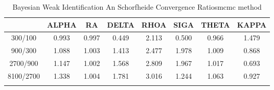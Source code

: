 \documentclass[a4paper,10pt]{article}
\begin{document}
\centering
\begin{longtable}{cccccccc}
\toprule
 & ALPHA & RA & DELTA & RHOA & SIGA & THETA & KAPPA \\
\midrule
300/100 & 0.993 & 0.997 & 0.449 & 2.113 & 0.500 & 0.966 & 1.479 \\
900/300 & 1.088 & 1.003 & 1.413 & 2.477 & 1.978 & 1.009 & 0.868 \\
2700/900 & 1.147 & 1.002 & 1.568 & 2.809 & 1.967 & 1.017 & 0.693 \\
8100/2700 & 1.338 & 1.004 & 1.781 & 3.016 & 1.244 & 1.063 & 0.927 \\
\bottomrule
\caption{Bayesian Weak Identification An Schorfheide Convergence Ratiosmcmc method}
\label{table:tbl:WeakAnSchoConvergenceRatios_mcmc}
\end{longtable}
\end{document}
